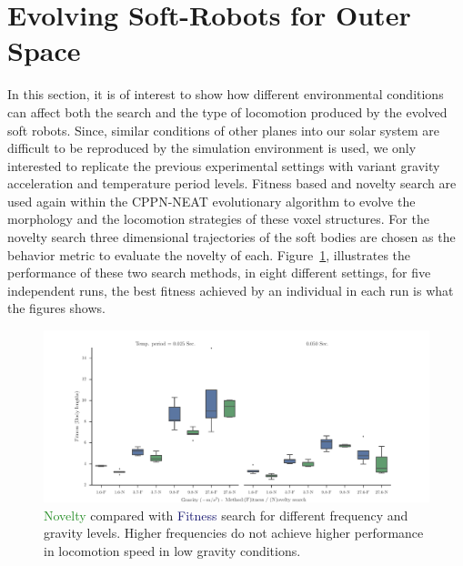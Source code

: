 \section{Evolving Soft-Robots for Outer Space}  

In this section, it is of interest to show how different environmental conditions can affect both the search and the type of locomotion produced by the evolved soft robots. Since, similar conditions of other planes into our solar system are difficult to be reproduced by the simulation environment is used, we only interested to replicate the previous experimental settings with variant gravity acceleration and temperature period levels. Fitness based and novelty search are used again within the CPPN-NEAT evolutionary algorithm to evolve the morphology and the locomotion strategies of these voxel structures. For the novelty search three dimensional trajectories of the soft bodies are chosen as the behavior metric to evaluate the novelty of each. Figure~\ref{fig:GravityExperiment1}, illustrates the performance of these two search methods, in eight different settings, for five independent runs, the best fitness achieved by an individual in each run is what the figures shows.


\begin{figure}
\centering
\includegraphics[width=1.0\textwidth]{../Figures/Results/GravityExperiment1.pdf}
\caption{\textcolor{ForestGreen}{Novelty} compared with \textcolor{MidnightBlue}{Fitness} search for different frequency and gravity levels. Higher frequencies do not achieve higher performance in locomotion speed in low gravity conditions.}
\label{fig:GravityExperiment1}
\end{figure}


